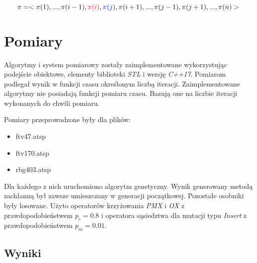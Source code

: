 \documentclass[12pt]{article}
\begin{document}
\begin{equation}
    \label{eq:3}
    \pi=<\pi(1),...,\pi(i-1),\mathbin{\color{red}\pi(i)},\mathbin{\color{blue}\pi(j)},\pi(i+1),...,\pi(j-1),\pi(j+1),...,\pi(n)>
\end{equation}

\section{Pomiary}
Algorytmy i system pomiarowy zostały zaimplementowane wykorzystując podejście obiektowe, elementy biblioteki \textit{STL} i wersję \textit{C++17}.
Pomiarom podlegał wynik w funkcji czasu określonym liczbą iteracji. Zaimplementowane algorytmy nie posiadają funkcji pomiaru czasu. Bazują one na liczbie iteracji wykonanych do chwili pomiaru.

Pomiary przeprowadzone były dla plików:
\begin{itemize}[noitemsep]
    \item ftv47.atsp
    \item ftv170.atsp
    \item rbg403.atsp
\end{itemize}
Dla każdego z nich uruchomiono algorytm genetyczny. Wynik generowany metodą zachłanną był zawsze umieszczany w generacji początkowej. Pozostałe osobniki były losowane.
Użyto operatorów krzyżowania \textit{PMX} i \textit{OX} z prawdopodobieństwem $p_c=0.8$ i operatora sąsiedztwa dla mutacji typu \textit{Insert} z prawdopodobieństwem $p_m=0.01$.
\clearpage
\subsection{Wyniki}
\end{document}

